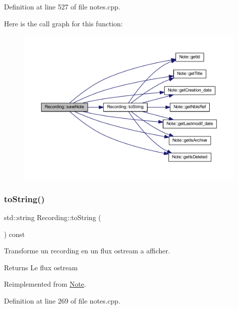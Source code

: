 Definition at line 527 of file notes.\+cpp.

Here is the call graph for this function\+:\nopagebreak
\begin{figure}[H]
\begin{center}
\leavevmode
\includegraphics[width=350pt]{class_recording_a99e10c8a8c13bce5f70195b6c30a1cc9_cgraph}
\end{center}
\end{figure}
\mbox{\label{class_recording_a9f403a39bec2db40c9171a6c3a20942d}} 
\subsubsection{\texorpdfstring{to\+String()}{toString()}}
{\footnotesize\ttfamily std\+::string Recording\+::to\+String (\begin{DoxyParamCaption}{ }\end{DoxyParamCaption}) const\hspace{0.3cm}{\ttfamily [virtual]}}



Transforme un recording en un flux ostream a afficher. 

\begin{DoxyReturn}{Returns}
Le flux ostream 
\end{DoxyReturn}


Reimplemented from \hyperlink{class_note_a1bd4acfbde0b71d05fd7d4ca889bca2b}{Note}.



Definition at line 269 of file notes.\+cpp.

